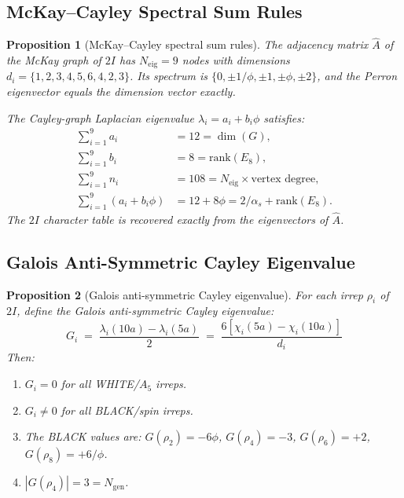 \documentclass[12pt,a4paper]{article}
\newtheorem{proposition}{Proposition}
\theoremstyle{definition}
\begin{document}
\subsection{McKay--Cayley Spectral Sum Rules}

\begin{proposition}[McKay--Cayley spectral sum rules]\label{prop:S-mckay-sumrules}
The adjacency matrix $\hat{A}$ of the McKay graph of $2I$ has $N_{\mathrm{eig}} = 9$ nodes with dimensions $d_i = \{1, 2, 3, 4, 5, 6, 4, 2, 3\}$.  Its spectrum is $\{0, \pm 1/\phi, \pm 1, \pm \phi, \pm 2\}$, and the Perron eigenvector equals the dimension vector exactly.

The Cayley-graph Laplacian eigenvalue $\lambda_i = a_i + b_i\phi$ satisfies:
\begin{align}
\sum_{i=1}^{9} a_i &= 12 = \dim(G), \\
\sum_{i=1}^{9} b_i &= 8 = \mathrm{rank}(E_8), \\
\sum_{i=1}^{9} n_i &= 108 = N_{\mathrm{eig}} \times \text{vertex degree}, \\
\sum_{i=1}^{9} (a_i + b_i\phi) &= 12 + 8\phi = 2/\alpha_s + \mathrm{rank}(E_8).
\end{align}
The $2I$ character table is recovered exactly from the eigenvectors of $\hat{A}$.
\end{proposition}

\subsection{Galois Anti-Symmetric Cayley Eigenvalue}

\begin{proposition}[Galois anti-symmetric Cayley eigenvalue]\label{prop:S-galois-antisym}
For each irrep $\rho_i$ of $2I$, define the \emph{Galois anti-symmetric Cayley eigenvalue}:
\begin{equation}
G_i \;=\; \frac{\lambda_i(10a) - \lambda_i(5a)}{2} \;=\; \frac{6[\chi_i(5a) - \chi_i(10a)]}{d_i}
\end{equation}
Then:
\begin{enumerate}
\item[\textup{(i)}] $G_i = 0$ for all WHITE/$A_5$ irreps.
\item[\textup{(ii)}] $G_i \neq 0$ for all BLACK/spin irreps.
\item[\textup{(iii)}] The BLACK values are:
$G(\rho_2) = -6\phi$, $G(\rho_4) = -3$, $G(\rho_6) = +2$, $G(\rho_8) = +6/\phi$.
\item[\textup{(iv)}] $|G(\rho_4)| = 3 = N_{\text{gen}}$.
\end{enumerate}
\end{proposition}
\end{document}
